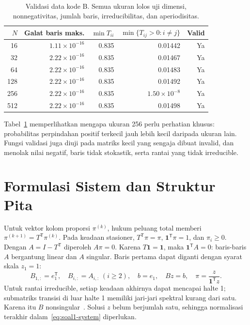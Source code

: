 \begin{table}[H]\centering\small
\caption{Validasi data kode B. Semua ukuran lolos uji dimensi, nonnegativitas, jumlah baris, irreducibilitas, dan aperiodisitas.}\label{tab:validasi-ringkas}
\begin{tabular}{rrrrr}\toprule
$N$ & Galat baris maks. & $\min T_{ii}$ & $\min\{T_{ij}>0:i\ne j\}$ & Valid\\\midrule
16 & $1.11\times10^{-16}$ & 0.835 & 0.01442 & Ya\\
32 & $2.22\times10^{-16}$ & 0.835 & 0.01467 & Ya\\
64 & $2.22\times10^{-16}$ & 0.835 & 0.01483 & Ya\\
128 & $2.22\times10^{-16}$ & 0.835 & 0.01492 & Ya\\
256 & $2.22\times10^{-16}$ & 0.835 & $1.50\times10^{-8}$ & Ya\\
512 & $2.22\times10^{-16}$ & 0.835 & 0.01498 & Ya\\\bottomrule
\end{tabular}\end{table}
Tabel~\ref{tab:validasi-ringkas} memperlihatkan mengapa ukuran 256 perlu perhatian khusus: probabilitas perpindahan positif terkecil jauh lebih kecil daripada ukuran lain. Fungsi validasi juga diuji pada matriks kecil yang sengaja dibuat invalid, dan menolak nilai negatif, baris tidak stokastik, serta rantai yang tidak irreducible.

\section{Formulasi Sistem dan Struktur Pita}
Untuk vektor kolom proporsi $\pi^{(k)}$, hukum peluang total memberi $\pi^{(k+1)}=T^\mathsf{T}\pi^{(k)}$. Pada keadaan stasioner, $T^\mathsf{T}\pi=\pi$, $\mathbf1^\mathsf{T}\pi=1$, dan $\pi_i\ge0$. Dengan $A=I-T^\mathsf{T}$ diperoleh $A\pi=0$. Karena $T\mathbf1=\mathbf1$, maka $\mathbf1^\mathsf{T}A=0$: baris-baris $A$ bergantung linear dan $A$ singular. Baris pertama dapat diganti dengan syarat skala $z_1=1$:
\begin{equation}\label{eq:soal1-system}
B_{1,:}=e_1^\mathsf{T},\quad B_{i,:}=A_{i,:}\ (i\ge2),\quad b=e_1,\quad Bz=b,\quad \pi=\frac{z}{\mathbf1^\mathsf{T}z}.
\end{equation}
Untuk rantai irreducible, setiap keadaan akhirnya dapat mencapai halte 1; submatriks transisi di luar halte 1 memiliki jari-jari spektral kurang dari satu. Karena itu $B$ nonsingular~\cite{stewart}. Solusi $z$ belum berjumlah satu, sehingga normalisasi terakhir dalam~\eqref{eq:soal1-system} diperlukan.

